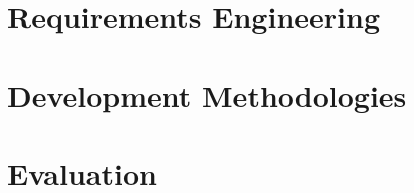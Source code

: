 


\section{Requirements Engineering}




\section{Development Methodologies}




\section{Evaluation}


